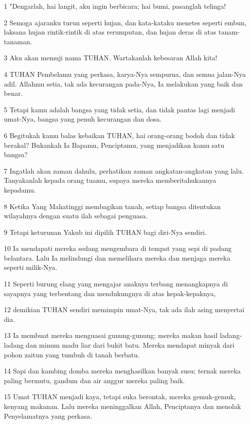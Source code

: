 \par 1 "Dengarlah, hai langit, aku ingin berbicara; hai bumi, pasanglah telinga!
\par 2 Semoga ajaranku turun seperti hujan, dan kata-kataku menetes seperti embun, laksana hujan rintik-rintik di atas rerumputan, dan hujan deras di atas tanam-tanaman.
\par 3 Aku akan memuji nama TUHAN. Wartakanlah kebesaran Allah kita!
\par 4 TUHAN Pembelamu yang perkasa, karya-Nya sempurna, dan semua jalan-Nya adil. Allahmu setia, tak ada kecurangan pada-Nya, Ia melakukan yang baik dan benar.
\par 5 Tetapi kamu adalah bangsa yang tidak setia, dan tidak pantas lagi menjadi umat-Nya, bangsa yang penuh kecurangan dan dosa.
\par 6 Begitukah kamu balas kebaikan TUHAN, hai orang-orang bodoh dan tidak berakal? Bukankah Ia Bapamu, Penciptamu, yang menjadikan kamu satu bangsa?
\par 7 Ingatlah akan zaman dahulu, perhatikan zaman angkatan-angkatan yang lalu. Tanyakanlah kepada orang tuamu, supaya mereka memberitahukannya kepadamu.
\par 8 Ketika Yang Mahatinggi membagikan tanah, setiap bangsa ditentukan wilayahnya dengan suatu ilah sebagai penguasa.
\par 9 Tetapi keturunan Yakub ini dipilih TUHAN bagi diri-Nya sendiri.
\par 10 Ia mendapati mereka sedang mengembara di tempat yang sepi di padang belantara. Lalu Ia melindungi dan memelihara mereka dan menjaga mereka seperti milik-Nya.
\par 11 Seperti burung elang yang mengajar anaknya terbang menangkapnya di sayapnya yang terbentang dan mendukungnya di atas kepak-kepaknya,
\par 12 demikian TUHAN sendiri memimpin umat-Nya, tak ada ilah asing menyertai dia.
\par 13 Ia membuat mereka menguasai gunung-gunung; mereka makan hasil ladang-ladang dan minum madu liar dari bukit batu. Mereka mendapat minyak dari pohon zaitun yang tumbuh di tanah berbatu.
\par 14 Sapi dan kambing domba mereka menghasilkan banyak susu; ternak mereka paling bermutu, gandum dan air anggur mereka paling baik.
\par 15 Umat TUHAN menjadi kaya, tetapi suka berontak, mereka gemuk-gemuk, kenyang makanan. Lalu mereka meninggalkan Allah, Penciptanya dan menolak Penyelamatnya yang perkasa.
